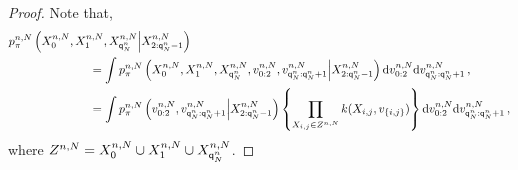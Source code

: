 \begin{proof}
Note that,
\begin{align*}
p_{\pi}^{n,N}\left(X_{0}^{n,N},X_{1}^{n,N},X_{\ordermax{n}{N}}^{n,N}\middle|X_{2:\ordermax{n}{N}-1}^{n,N}\right) &\\
&\hspace{-3cm}= \int p_{\pi}^{n,N}\left(X_{0}^{n,N},X_{1}^{n,N},X_{\ordermax{n}{N}}^{n,N},v_{0:2}^{n,N},v_{\ordermax{n}{N}:\ordermax{n}{N}+1}^{n,N}\middle|X_{2:\ordermax{n}{N}-1}^{n,N}\right)\rmd v_{0:2}^{n,N}\rmd v_{\ordermax{n}{N}:\ordermax{n}{N}+1}^{n,N}\eqsp,\\
&\hspace{-3cm}= \int p_{\pi}^{n,N}\left(v_{0:2}^{n,N},v_{\ordermax{n}{N}:\ordermax{n}{N}+1}^{n,N}\middle|X_{2:\ordermax{n}{N}-1}^{n,N}\right)\left\{\prod_{X_{i,j}\in Z^{n,N}}\condlik(X_{i,j},v_{\{i,j\}})\right\}\rmd v_{0:2}^{n,N}\rmd v_{\ordermax{n}{N}:\ordermax{n}{N}+1}^{n,N}\eqsp,
\end{align*}
where $Z^{n,N} = X_{0}^{n,N}\cup X_{1}^{n,N}\cup X_{{\mathsf{q}}^{n}_{N}}^{n,N}$.

\end{proof}
